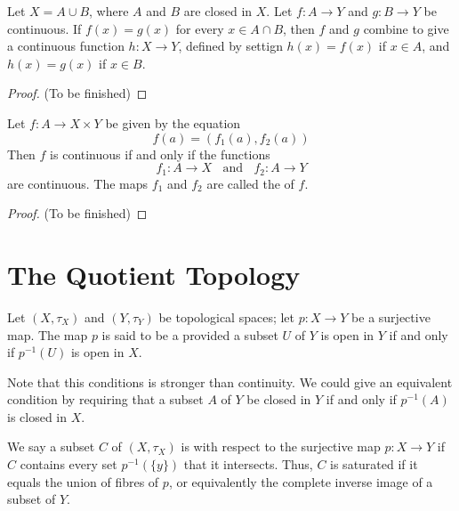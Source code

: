 \documentclass[12pt, a4paper, oneside, openright, titlepage]{book}
\begin{document}
\begin{thm}
    Let $X = A\cup B$, where $A$ and $B$ are closed in $X$. Let $f:A\rightarrow Y$ and $g:B\rightarrow Y$ be continuous. If $f(x) = g(x)$ for every $x \in A\cap B$, then $f$ and $g$ combine to give a continuous function $h:X\rightarrow Y$, defined by settign $h(x) = f(x)$ if $x \in A$, and $h(x) = g(x)$ if $x \in B$.
\end{thm}
\begin{proof}
    (To be finished)
\end{proof}

\begin{thm}
    Let $f:A\rightarrow X\times Y$ be given by the equation \begin{equation*}
        f(a) = (f_1(a), f_2(a))
    \end{equation*}
    Then $f$ is continuous if and only if the functions \begin{equation*}
        f_1:A\rightarrow X\;\;\text{ and }\;\;f_2:A\rightarrow Y
    \end{equation*}
    are continuous. The maps $f_1$ and $f_2$ are called the  of $f$.
\end{thm}
\begin{proof}
    (To be finished)
\end{proof}



\section{The Quotient Topology}

\begin{defn}
    Let $(X,\tau_X)$ and $(Y,\tau_Y)$ be topological spaces; let $p:X\rightarrow Y$ be a surjective map. The map $p$ is said to be a  provided a subset $U$ of $Y$ is open in $Y$ if and only if $p^{-1}(U)$ is open in $X$.
\end{defn}

Note that this conditions is stronger than continuity. We could give an equivalent condition by requiring that a subset $A$ of $Y$ be closed in $Y$ if and only if $p^{-1}(A)$ is closed in $X$.

\begin{defn}
    We say a subset $C$ of $(X,\tau_X)$ is  with respect to the surjective map $p:X\rightarrow Y$ if $C$ contains every set $p^{-1}(\{y\})$ that it intersects. Thus, $C$ is saturated if it equals the union of fibres of $p$, or equivalently the complete inverse image of a subset of $Y$. 
\end{defn}
\end{document}
